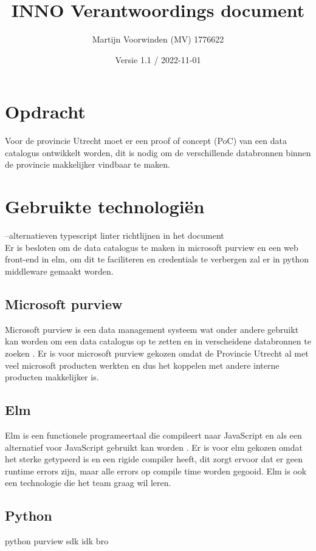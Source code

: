 \documentclass[12pt, a4paper]{report}
\title{INNO Verantwoordings document}
\author{Martijn Voorwinden (MV)   1776622}
\date{Versie 1.1 / 2022-11-01}
\begin{document}
    \maketitle
    \begin{versionhistory}
    \end{versionhistory}
    \newpage
    \tableofcontents
    \chapter{Opdracht}
    Voor de provincie Utrecht moet er een proof of concept (PoC) van een data catalogus ontwikkelt worden,
    dit is nodig om de verschillende databronnen binnen de provincie makkelijker vindbaar te maken.

    \chapter{Gebruikte technologiën}
    --alternatieven typescript linter richtlijnen in het document \\

    Er is besloten om de data catalogus te maken in microsoft purview en een web front-end in elm,
     om dit te faciliteren en credentials te verbergen zal er in python middleware gemaakt worden.
    \section{Microsoft purview}
    Microsoft purview is een data management systeem wat onder andere gebruikt kan worden om een data catalogus op te zetten en in verscheidene databronnen te zoeken \cite{purview}.
    Er is voor microsoft purview gekozen omdat de Provincie Utrecht al met veel microsoft producten werkten en dus het koppelen met andere interne \\ producten makkelijker is.
    \section{Elm}
    Elm is een functionele programeertaal die compileert naar JavaScript en als een alternatief voor JavaScript gebruikt kan worden \cite{elm}.
    Er is voor elm gekozen omdat het sterke getypeerd is en een rigide compiler heeft,
    dit zorgt ervoor dat er geen runtime errors zijn, maar alle errors op compile time worden gegooid.
    Elm is ook een technologie die het team graag wil leren.
    \section{Python}
    python purview sdk idk bro
\end{document}
